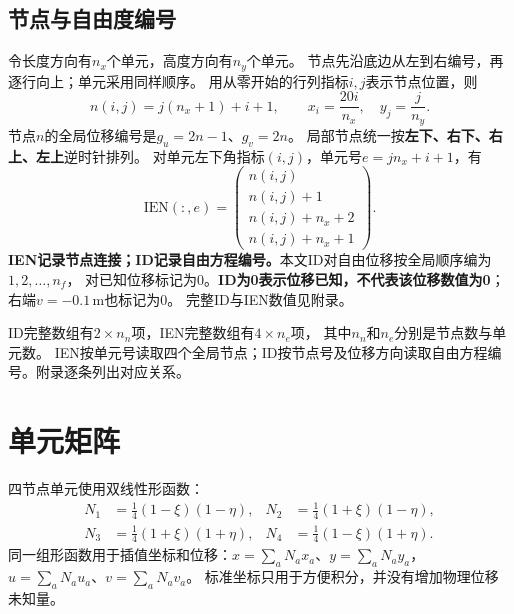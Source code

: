 \documentclass[UTF8,a4paper,fontset=fandol,10pt]{ctexart}
\begin{document}
\subsection{节点与自由度编号}
令长度方向有$n_x$个单元，高度方向有$n_y$个单元。
节点先沿底边从左到右编号，再逐行向上；单元采用同样顺序。
用从零开始的行列指标$i,j$表示节点位置，则
\begin{equation}
 n(i,j)=j(n_x+1)+i+1,\qquad
 x_i=\frac{20i}{n_x},\quad y_j=\frac{j}{n_y}.
\end{equation}
节点$n$的全局位移编号是$g_u=2n-1$、$g_v=2n$。
局部节点统一按\textbf{左下、右下、右上、左上}逆时针排列。
对单元左下角指标$(i,j)$，单元号$e=jn_x+i+1$，有
\begin{equation}
 \mathrm{IEN}(:,e)=
 \begin{pmatrix}n(i,j)\\n(i,j)+1\\n(i,j)+n_x+2\\n(i,j)+n_x+1\end{pmatrix}.
\end{equation}
\textbf{IEN记录节点连接；ID记录自由方程编号。}本文ID对自由位移按全局顺序编为$1,2,\ldots,n_f$，
对已知位移标记为0。\textbf{ID为0表示位移已知，不代表该位移数值为0}；右端$v=-0.1\,\mathrm m$也标记为0。
完整ID与IEN数值见附录。

ID完整数组有$2\times n_n$项，IEN完整数组有$4\times n_e$项，
其中$n_n$和$n_e$分别是节点数与单元数。
IEN按单元号读取四个全局节点；ID按节点号及位移方向读取自由方程编号。附录逐条列出对应关系。


\section{单元矩阵}
四节点单元使用双线性形函数：
\begin{equation}
\begin{aligned}
N_1&=\tfrac14(1-\xi)(1-\eta),&N_2&=\tfrac14(1+\xi)(1-\eta),\\
N_3&=\tfrac14(1+\xi)(1+\eta),&N_4&=\tfrac14(1-\xi)(1+\eta).
\end{aligned}
\end{equation}
同一组形函数用于插值坐标和位移：$x=\sum_aN_ax_a$、$y=\sum_aN_ay_a$，
$u=\sum_aN_au_a$、$v=\sum_aN_av_a$。
标准坐标只用于方便积分，并没有增加物理位移未知量。
\end{document}
